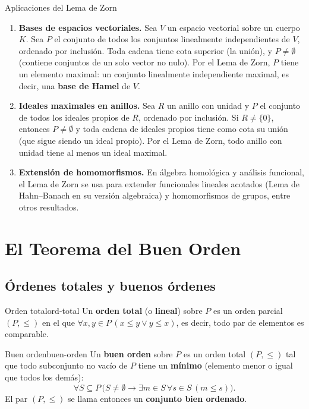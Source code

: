 \begin{ejemplo}{Aplicaciones del Lema de Zorn}{}
\begin{enumerate}[leftmargin=2em, label=(\alph*)]
  \item \textbf{Bases de espacios vectoriales.} Sea $V$ un espacio vectorial sobre un cuerpo $K$. Sea $P$ el conjunto de todos los conjuntos linealmente independientes de $V$, ordenado por inclusión. Toda cadena tiene cota superior (la unión), y $P \neq \emptyset$ (contiene conjuntos de un solo vector no nulo). Por el Lema de Zorn, $P$ tiene un elemento maximal: un conjunto linealmente independiente maximal, es decir, una \textbf{base de Hamel} de $V$.

  \item \textbf{Ideales maximales en anillos.} Sea $R$ un anillo con unidad y $P$ el conjunto de todos los ideales propios de $R$, ordenado por inclusión. Si $R \neq \{0\}$, entonces $P \neq \emptyset$ y toda cadena de ideales propios tiene como cota su unión (que sigue siendo un ideal propio). Por el Lema de Zorn, todo anillo con unidad tiene al menos un ideal maximal.

  \item \textbf{Extensión de homomorfismos.} En álgebra homológica y análisis funcional, el Lema de Zorn se usa para extender funcionales lineales acotados (Lema de Hahn–Banach en su versión algebraica) y homomorfismos de grupos, entre otros resultados.
\end{enumerate}
\end{ejemplo}

\section{El Teorema del Buen Orden}

\subsection{Órdenes totales y buenos órdenes}

\begin{definicion}{Orden total}{ord-total}
Un \textbf{orden total} (o \textbf{lineal}) sobre $P$ es un orden parcial $(P, \leq)$ en el que $\forall x, y \in P\,(x \leq y \vee y \leq x)$, es decir, todo par de elementos es comparable.
\end{definicion}

\begin{definicion}{Buen orden}{buen-orden}
Un \textbf{buen orden} sobre $P$ es un orden total $(P, \leq)$ tal que todo subconjunto no vacío de $P$ tiene un \textbf{mínimo} (elemento menor o igual que todos los demás):
\[
  \forall S \subseteq P\,\bigl(S \neq \emptyset \to \exists m \in S\,\forall s \in S\,(m \leq s)\bigr).
\]
El par $(P, \leq)$ se llama entonces un \textbf{conjunto bien ordenado}.
\end{definicion}

